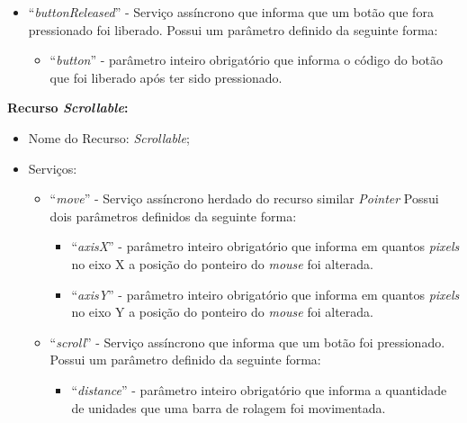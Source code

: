 \begin{itemize}
\begin{itemize}
			\item ``\emph{buttonReleased}'' - Serviço assíncrono que informa que um botão que fora pressionado foi liberado. Possui um parâmetro definido da seguinte forma:

				\begin{itemize}
					\item ``\emph{button}'' - parâmetro inteiro obrigatório que informa o código do botão que foi liberado após ter sido pressionado.
				\end{itemize}

		\end{itemize}
\end{itemize}

\textbf{Recurso \emph{Scrollable}:}

\begin{itemize}
	
	\item Nome do Recurso: \emph{Scrollable};

	\item Serviços:
		
		\begin{itemize}

			\item ``\emph{move}'' - Serviço assíncrono herdado do recurso similar \emph{Pointer} Possui dois parâmetros definidos da seguinte forma:

				\begin{itemize}
					\item ``\emph{axisX}'' - parâmetro inteiro obrigatório que informa em quantos \emph{pixels} no eixo X a posição do ponteiro do \emph{mouse} foi alterada.

					\item ``\emph{axisY}'' - parâmetro inteiro obrigatório que informa em quantos \emph{pixels} no eixo Y a posição do ponteiro do \emph{mouse} foi alterada.
				\end{itemize}
			
			\item ``\emph{scroll}'' - Serviço assíncrono que informa que um botão foi pressionado. Possui um parâmetro definido da seguinte forma:

				\begin{itemize}
					\item ``\emph{distance}'' - parâmetro inteiro obrigatório que informa a quantidade de unidades que uma barra de rolagem foi movimentada.
				\end{itemize}

		\end{itemize}
\end{itemize}

